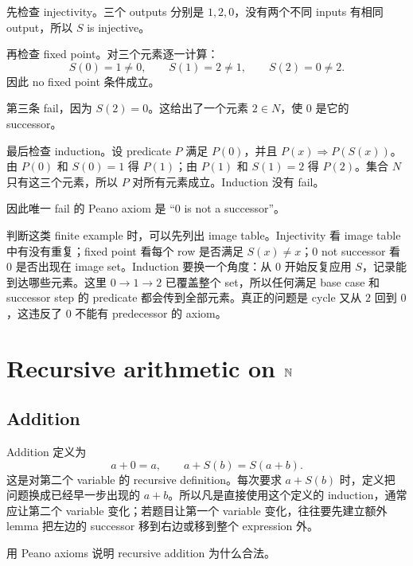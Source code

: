 \begin{solution}
先检查 injectivity。三个 outputs 分别是 \(1,2,0\)，没有两个不同 inputs 有相同
output，所以 \(S\) is injective。

再检查 fixed point。对三个元素逐一计算：
\[
S(0)=1\neq0,\qquad S(1)=2\neq1,\qquad S(2)=0\neq2.
\]
因此 no fixed point 条件成立。

第三条 fail，因为 \(S(2)=0\)。这给出了一个元素 \(2\in N\)，使 \(0\) 是它的
successor。

最后检查 induction。设 predicate \(P\) 满足 \(P(0)\)，并且 \(P(x)\Rightarrow
P(S(x))\)。由 \(P(0)\) 和 \(S(0)=1\) 得 \(P(1)\)；由 \(P(1)\) 和 \(S(1)=2\)
得 \(P(2)\)。集合 \(N\) 只有这三个元素，所以 \(P\) 对所有元素成立。Induction
没有 fail。

因此唯一 fail 的 Peano axiom 是 ``\(0\) is not a successor''。
\end{solution}

\begin{explanation}
判断这类 finite example 时，可以先列出 image table。Injectivity 看 image table
中有没有重复；fixed point 看每个 row 是否满足 \(S(x)\neq x\)；\(0\) not successor
看 \(0\) 是否出现在 image set。Induction 要换一个角度：从 \(0\) 开始反复应用
\(S\)，记录能到达哪些元素。这里 \(0\to1\to2\) 已覆盖整个 set，所以任何满足
base case 和 successor step 的 predicate 都会传到全部元素。真正的问题是 cycle
又从 \(2\) 回到 \(0\)，这违反了 \(0\) 不能有 predecessor 的 axiom。
\end{explanation}

\section{Recursive arithmetic on \texorpdfstring{\(\mathbb{N}\)}{N}}

\subsection{Addition}

Addition 定义为
\[
  a+0=a,\qquad a+S(b)=S(a+b).
\]
这是对第二个 variable 的 recursive definition。每次要求 \(a+S(b)\) 时，定义把
问题换成已经早一步出现的 \(a+b\)。所以凡是直接使用这个定义的 induction，通常
应让第二个 variable 变化；若题目让第一个 variable 变化，往往要先建立额外 lemma
把左边的 successor 移到右边或移到整个 expression 外。

\begin{exerciseblock}
用 Peano axioms 说明 recursive addition 为什么合法。
\end{exerciseblock}

